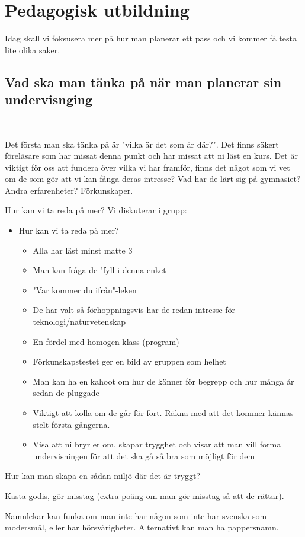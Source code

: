 \section{Pedagogisk utbildning}
\par\bigskip
\noindent Idag skall vi foksusera mer på hur man planerar ett pass och vi kommer få testa lite olika saker.
\par\bigskip
\subsection{Vad ska man tänka på när man planerar sin undervisnging}\hfill\\
\par\bigskip
\noindent Det första man ska tänka på är "vilka är det som är där?". Det finns säkert föreläsare som har missat denna punkt och har missat att ni läst en kurs. Det är viktigt för oss att fundera över vilka vi har framför, finns det något som vi vet om de som gör att vi kan fånga deras intresse? Vad har de lärt sig på gymnasiet? Andra erfarenheter? Förkunskaper.\par
\noindent Hur kan vi ta reda på mer? Vi diskuterar i grupp:
\par\bigskip
\begin{itemize}
  \item Hur kan vi ta reda på mer?
    \begin{itemize}
      \item Alla har läst minst matte 3
      \item Man kan fråga de "fyll i denna enket
      \item "Var kommer du ifrån"-leken 
      \item De har valt så förhoppningsvis har de redan intresse för teknologi/naturvetenskap
      \item En fördel med homogen klass (program)
      \item Förkunskapstestet ger en bild av gruppen som helhet
      \item Man kan ha en kahoot om hur de känner för begrepp och hur många år sedan de pluggade
      \item Viktigt att kolla om de går för fort. Räkna med att det kommer kännas stelt första gångerna.
      \item Visa att ni bryr er om, skapar trygghet och visar att man vill forma undervisningen för att det ska gå så bra som möjligt för dem
    \end{itemize}
\end{itemize}
\par\bigskip
\noindent Hur kan man skapa en sådan miljö där det är tryggt?\par
\noindent Kasta godis, gör misstag (extra poäng om man gör misstag så att de rättar).
\par\bigskip
\noindent Namnlekar kan funka om man inte har någon som inte har svenska som modersmål, eller har hörsvårigheter. Alternativt kan man ha pappersnamn.
\par\bigskip
